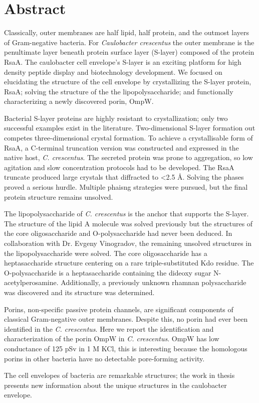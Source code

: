 
\chapter{Abstract}

Classically, outer membranes are half lipid, half protein, and the outmost layers of Gram-negative bacteria. For \textit{Caulobacter crescentus} the outer membrane is the penultimate layer beneath protein surface layer (S-layer) composed of the protein RsaA. The caulobacter cell envelope's S-layer is an exciting platform for high density peptide display and biotechnology development. We focused on elucidating the structure of the cell envelope by crystallizing the S-layer protein, RsaA; solving the structure of the the lipopolysaccharide; and functionally characterizing a newly discovered porin, OmpW. 

Bacterial S-layer proteins are highly resistant to crystallization; only two successful examples exist in the literature. Two-dimensional S-layer formation out competes three-dimensional crystal formation. To achieve a crystallisable form of RsaA, a C-terminal truncation version was constructed and expressed in the native host, \textit{C. crescentus}. The secreted protein was prone to aggregation, so low agitation and slow concentration protocols had to be developed. The RsaA truncate produced large crystals that diffracted to <2.5 \AA. Solving the phases proved a serious hurdle. Multiple phaisng strategies were pursued, but the final protein structure remains unsolved.

The lipopolysaccharide of \textit{C. crescentus} is the anchor that supports the S-layer. The structure of the lipid A molecule was solved previously but the structures of the core oligosaccharide and O-polysaccharide had never been deduced. In collaboration with Dr. Evgeny Vinogradov, the remaining unsolved structures in the lipopolysaccharide were solved. The core oligosaccharide has a heptasaccharide structure centering on a rare triple-substituted Kdo residue. The O-polysaccharide is a heptasaccharide containing the dideoxy sugar N-acetylperosamine. Additionally, a previously unknown rhamnan polysaccharide was discovered and its structure was determined. 

Porins, non-specific passive protein channels, are significant components of classical Gram-negative outer membranes. Despite this, no porin had ever been identified in the \textit{C. crescentus}. Here we report the identification and characterization of the porin OmpW in \textit{C. crescentus}.  OmpW has low conductance of 125 pSv in 1 M KCl, this is interesting because the homologous porins in other bacteria have no detectable pore-forming activity.

The cell envelopes of bacteria are remarkable structures; the work in thesis presents new information about the unique structures in the caulobacter envelope. 
